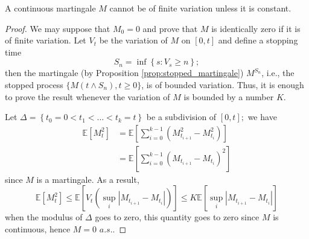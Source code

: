 \begin{proposition}
	 A continuous martingale $M$ cannot be of finite variation unless it is constant.
\end{proposition}
\begin{proof}
	We may suppose that $M_{0}=0$ and prove that $M$ is identically zero if it is of finite variation. Let $V_{t}$ be the variation of $M$ on $[0, t]$ and define a stopping time \[ S_{n}=\inf \left\{s: V_{s} \geq n\right\};\]
	then the martingale (by Proposition \ref{prop:stopped_martingale}) $M^{S_{n}}$, i.e., the stopped process $\{M(t \wedge S_n), t \geq 0\}$, is of bounded variation. Thus, it is enough to prove the result whenever the variation of $M$ is bounded by a number $K$.

	Let $\Delta=\left\{t_{0}=0<t_{1}<\ldots<t_{k}=t\right\}$ be a subdivision of $[0, t] ;$ we have \[ \begin{aligned} \mathbb{E}\left[M_{t}^{2}\right] &=\mathbb{E}\left[\sum_{i=0}^{k-1}\left(M_{t_{i+1}}^{2}-M_{t_{i}}^{2}\right)\right] \\ &=\mathbb{E}\left[\sum_{i=0}^{k-1}\left(M_{t_{i+1}}-M_{t_{i}}\right)^{2}\right] \end{aligned} \] since $M$ is a martingale. As a result,
	\[ \mathbb{E}\left[M_{t}^{2}\right] \leq \mathbb{E}\left[V_{t}\left(\sup _{i}\left|M_{t_{i+1}}-M_{t_{i}}\right|\right)\right] \leq K \mathbb{E}\left[\sup _{i}\left|M_{t_{i+1}}-M_{t_{i}}\right|\right] \]
	when the modulus of $\Delta$ goes to zero, this quantity goes to zero since $M$ is continuous, hence $M=0$ $a.s.$.
\end{proof}

